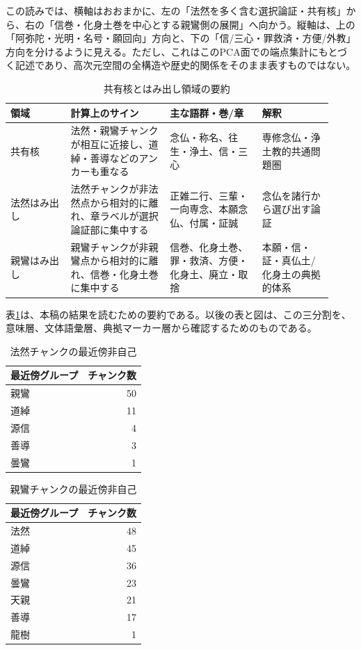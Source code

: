 \documentclass[uplatex,dvipdfmx,11pt,a4paper]{jsarticle}
\begin{document}
この読みでは、横軸はおおまかに、左の「法然を多く含む選択論証・共有核」から、右の「信巻・化身土巻を中心とする親鸞側の展開」へ向かう。縦軸は、上の「阿弥陀・光明・名号・願回向」方向と、下の「信/三心・罪救済・方便/外教」方向を分けるように見える。ただし、これはこのPCA面での端点集計にもとづく記述であり、高次元空間の全構造や歴史的関係をそのまま表すものではない。

\begin{table}[H]
\centering
\small
\caption{共有核とはみ出し領域の要約}
\label{tab:shared-protrusion-summary}
\begin{tabular}{@{}p{0.17\linewidth}p{0.29\linewidth}p{0.26\linewidth}p{0.20\linewidth}@{}}
\toprule
領域 & 計算上のサイン & 主な語群・巻/章 & 解釈 \\
\midrule
共有核 & 法然・親鸞チャンクが相互に近接し、道綽・善導などのアンカーも重なる & 念仏・称名、往生・浄土、信・三心 & 専修念仏・浄土教的共通問題圏 \\
法然はみ出し & 法然チャンクが非法然点から相対的に離れ、章ラベルが選択論証部に集中する & 正雑二行、三輩・一向専念、本願念仏、付属・証誠 & 念仏を諸行から選び出す論証 \\
親鸞はみ出し & 親鸞チャンクが非親鸞点から相対的に離れ、信巻・化身土巻に集中する & 信巻、化身土巻、罪・救済、方便・化身土、廃立・取捨 & 本願・信・証・真仏土/化身土の典拠的体系 \\
\bottomrule
\end{tabular}
\end{table}

表\ref{tab:shared-protrusion-summary}は、本稿の結果を読むための要約である。以後の表と図は、この三分割を、意味層、文体語彙層、典拠マーカー層から確認するためのものである。

\begin{table}[H]
\centering
\small
\caption{法然チャンクの最近傍非自己}
\label{tab:honen-nearest}
\begin{tabular}{@{}lr@{}}
\toprule
最近傍グループ & チャンク数 \\
\midrule
親鸞 & 50 \\
道綽 & 11 \\
源信 & 4 \\
善導 & 3 \\
曇鸞 & 1 \\
\bottomrule
\end{tabular}
\end{table}

\begin{table}[H]
\centering
\small
\caption{親鸞チャンクの最近傍非自己}
\label{tab:shinran-nearest}
\begin{tabular}{@{}lr@{}}
\toprule
最近傍グループ & チャンク数 \\
\midrule
法然 & 48 \\
道綽 & 45 \\
源信 & 36 \\
曇鸞 & 23 \\
天親 & 21 \\
善導 & 17 \\
龍樹 & 1 \\
\bottomrule
\end{tabular}
\end{table}
\end{document}
